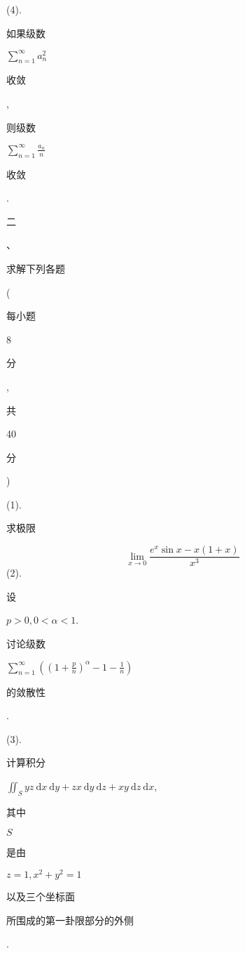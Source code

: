 \documentclass[10pt]{article}
\begin{document}
(4). \begin{CJK}{UTF8}{mj}如果级数\end{CJK} $\sum_{n=1}^{\infty} a_{n}^{2}$ \begin{CJK}{UTF8}{mj}收敛\end{CJK}, \begin{CJK}{UTF8}{mj}则级数\end{CJK} $\sum_{n=1}^{\infty} \frac{a_{n}}{n}$ \begin{CJK}{UTF8}{mj}收敛\end{CJK}.

\begin{CJK}{UTF8}{mj}二\end{CJK}、\begin{CJK}{UTF8}{mj}求解下列各题\end{CJK} (\begin{CJK}{UTF8}{mj}每小题\end{CJK} 8 \begin{CJK}{UTF8}{mj}分\end{CJK}, \begin{CJK}{UTF8}{mj}共\end{CJK} 40 \begin{CJK}{UTF8}{mj}分\end{CJK})

(1). \begin{CJK}{UTF8}{mj}求极限\end{CJK}
$$
\lim _{x \rightarrow 0} \frac{e^{x} \sin x-x(1+x)}{x^{3}}
$$
(2). \begin{CJK}{UTF8}{mj}设\end{CJK} $p>0,0<\alpha<1$. \begin{CJK}{UTF8}{mj}讨论级数\end{CJK} $\sum_{n=1}^{\infty}\left(\left(1+\frac{p}{n}\right)^{\alpha}-1-\frac{1}{n}\right)$ \begin{CJK}{UTF8}{mj}的敛散性\end{CJK}.

(3). \begin{CJK}{UTF8}{mj}计算积分\end{CJK} $\iint_{S} y z \mathrm{~d} x \mathrm{~d} y+z x \mathrm{~d} y \mathrm{~d} z+x y \mathrm{~d} z \mathrm{~d} x$, \begin{CJK}{UTF8}{mj}其中\end{CJK} $S$ \begin{CJK}{UTF8}{mj}是由\end{CJK} $z=1, x^{2}+y^{2}=1$ \begin{CJK}{UTF8}{mj}以及三个坐标面\end{CJK} \begin{CJK}{UTF8}{mj}所围成的第一卦限部分的外侧\end{CJK}.
\end{document}
